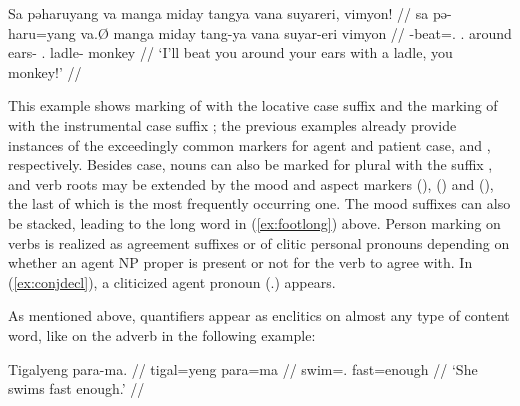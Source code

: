 \ex\label{ex:conjdecl}\begingl
	\gla Sa pəharuyang va manga miday tangya vana suyareri, vimyon! //
	\glb sa pə-haru=yang va.Ø manga miday tang-ya vana suyar-eri vimyon //
	\glc \PatT{} \NFut{}-beat=\Fsg{}.\Aarg{} \Ssg{}.\Top{} \Dyn{} around 
		ears-\Loc{} \Ssg{}.\Gen{} ladle-\Ins{} monkey //
	\glft `I'll beat you around your ears with a ladle, you monkey!' //
\endgl\xe

This example shows marking of  with the locative case
suffix  and the marking of  with the
instrumental case suffix ; the previous examples already
provide instances of the exceedingly common markers for agent and patient case,
 and , respectively. Besides case, nouns can
also be marked for plural with the suffix , and verb roots may
be extended by the mood and aspect markers  (\Irr{}),
 (\Hab{}) and  (\Neg{}), the last of which is 
the most frequently occurring one. The mood suffixes can also be stacked,
leading to the long word in (\ref{ex:footlong}) above. Person marking on verbs
is realized as agreement suffixes or of clitic personal pronouns depending on
whether an agent NP proper is present or not for the verb to agree with. In
(\ref{ex:conjdecl}), a cliticized agent pronoun 
(\TsgM{}.\Aarg{}) appears.

As mentioned above, quantifiers appear as enclitics on almost any type of 
content word, like on the adverb  in the following example:

\ex
\begingl
	\gla Tigalyeng para-ma. //
	\glb tigal=yeng para=ma //
	\glc swim=\TsgF{}.\Aarg{} fast=enough //
	\glft `She swims fast enough.' //
\endgl

% 
% 

